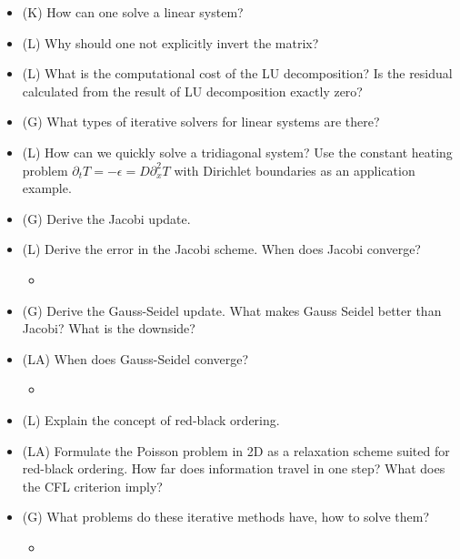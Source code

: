 \begin{itemize}
    \item (K) How can one solve a linear system?
    \answerboxM
    \item (L) Why should one not explicitly invert the matrix?
    \answerboxM
    \item (L) What is the computational cost of the LU decomposition? Is the residual calculated from the result of LU decomposition exactly zero?
    \answerboxM
    \item (G) What types of iterative solvers for linear systems are there?
    \answerboxM
    \item (L) How can we quickly solve a tridiagonal system? Use the constant
    heating problem $\partial_t T = -\epsilon = D \partial_x^2 T$ with
    Dirichlet boundaries as an application example.
    \answerboxM
    \item (G) Derive the Jacobi update.
    \answerboxM
    \item (L) Derive the error in the Jacobi scheme. When does Jacobi converge?
    \begin{itemize}
        \item {}
    \end{itemize}
    \answerboxM
    \item (G) Derive the Gauss-Seidel update. What makes Gauss Seidel better than Jacobi? What is the downside?
    \answerboxM
    \item (LA) When does Gauss-Seidel converge?
    \begin{itemize}
        \item {}
    \end{itemize}
    \answerboxS
    \item (L) Explain the concept of red-black ordering.
    \answerboxS
    \item (LA) Formulate the Poisson problem in 2D as
    a relaxation scheme suited for red-black ordering. How far does information travel in one step? What does the CFL criterion imply?
    \answerboxM
    \item (G) What problems do these iterative methods have, how to solve them?
    \begin{itemize}
        \item {}
\end{itemize}
\end{itemize}
